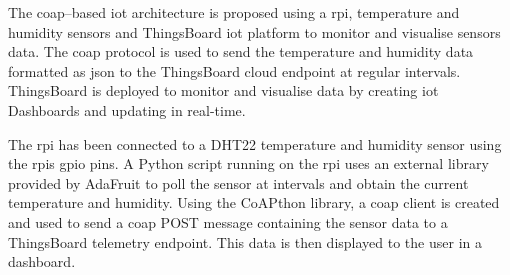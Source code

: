 The \gls{coap}--based \gls{iot} architecture is proposed using a \acrlong{rpi},
temperature and humidity sensors and ThingsBoard \gls{iot} platform to monitor 
and visualise sensors data.
The \gls{coap} protocol is used to send the temperature and humidity data 
formatted as \acrfull{json} to the ThingsBoard cloud endpoint at regular intervals.
ThingsBoard is deployed to monitor and visualise data by creating  \gls{iot} 
Dashboards and updating in real-time.

The \gls{rpi} has been connected to a DHT22 temperature and humidity sensor using
the \glspl{rpi} \gls{gpio} pins. A Python script running on the \gls{rpi} uses
an external library provided by AdaFruit to poll the sensor at intervals and 
obtain the current temperature and humidity. Using the CoAPthon 
library, a \gls{coap} client is created and used to send a \gls{coap} POST 
message containing the sensor data to a ThingsBoard telemetry endpoint.
This data is then displayed to the user in a dashboard.

